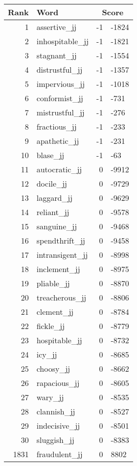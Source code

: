 \begin{longtable}[!htbp]{| rlr@{.}l |}
    \hline
    \textbf{Rank} & \textbf{Word} & \multicolumn{2}{c|}{\textbf{Score}} \\
    \hline
    \endhead
    1 & assertive\_jj & -1 & -1824 \\
    2 & inhospitable\_jj & -1 & -1821 \\
    3 & stagnant\_jj & -1 & -1554 \\
    4 & distrustful\_jj & -1 & -1357 \\
    5 & impervious\_jj & -1 & -1018 \\
    6 & conformist\_jj & -1 & -731 \\
    7 & mistrustful\_jj & -1 & -276 \\
    8 & fractious\_jj & -1 & -233 \\
    9 & apathetic\_jj & -1 & -231 \\
    10 & blase\_jj & -1 & -63 \\
    11 & autocratic\_jj & 0 & -9912 \\
    12 & docile\_jj & 0 & -9729 \\
    13 & laggard\_jj & 0 & -9629 \\
    14 & reliant\_jj & 0 & -9578 \\
    15 & sanguine\_jj & 0 & -9468 \\
    16 & spendthrift\_jj & 0 & -9458 \\
    17 & intransigent\_jj & 0 & -8998 \\
    18 & inclement\_jj & 0 & -8975 \\
    19 & pliable\_jj & 0 & -8870 \\
    20 & treacherous\_jj & 0 & -8806 \\
    21 & clement\_jj & 0 & -8784 \\
    22 & fickle\_jj & 0 & -8779 \\
    23 & hospitable\_jj & 0 & -8732 \\
    24 & icy\_jj & 0 & -8685 \\
    25 & choosy\_jj & 0 & -8662 \\
    26 & rapacious\_jj & 0 & -8605 \\
    27 & wary\_jj & 0 & -8535 \\
    28 & clannish\_jj & 0 & -8527 \\
    29 & indecisive\_jj & 0 & -8501 \\
    30 & sluggish\_jj & 0 & -8383 \\
    1831 & fraudulent\_jj & 0 & 8802 \\

\end{longtable}
